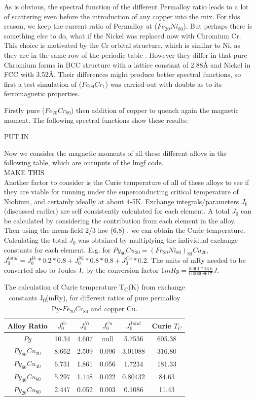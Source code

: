 \documentclass[12pt]{article}
\begin{document}
As is obvious, the spectral function of the different Permalloy ratio leads to a lot of scattering even before the introduction of any copper into the mix. For this reason, we keep the current ratio of Permalloy at ($Fe_{20}Ni_{80}$). But perhaps there is something else to do, what if the Nickel was replaced now with Chromium Cr. This choice is motivated by the Cr orbital structure, which is similar to Ni, as they are in the same row of the periodic table \cite{ashcroft}. However they differ in that pure Chromium forms in BCC structure with a lattice constant of 2.88{\AA} and Nickel in FCC with 3.52{\AA}. Their differences might produce better spectral functions, so first a test simulation of ($Fe_{99}Cr_{1}$) was carried out with doubts as to its ferromagnetic properties.

Firstly pure ($Fe_{20}Cr_{80}$) then addition of copper to quench again the magnetic moment. The following spectral functions show these results:



PUT IN

Now we consider the magnetic moments of all these different alloys in the following table, which are outuputs of the lmgf code.
\\ 
MAKE THIS
\\
\clearpage
Another factor to consider is the Curie temperature of all of these alloys to see if they are viable for running under the superconducting critical temperature of Niobium, and certainly ideally at about 4-5K. Exchange integrals/parameters $J_0$ (discussed earlier) are self consistently calculated for each element. A total $J_0$ can be calculated by considering the contribution from each element in the alloy. Then using the mean-field 2/3 law (6.8) , we can obtain the Curie temperature. Calculating the total $J_0$ was obtained by multiplying the individual exchange constants for each element. E.g. for $Py_{80}Cu_{20}=(Fe_{20}Ni_{80})_{80}Cu_{20}$, $J_0^{total}=J_0^{Fe}*0.2*0.8+J_0^{Ni}*0.8*0.8+J_0^{Cu}*0.2$. The units of mRy needed to be converted also to Joules J, by the conversion factor $1mRy=\frac{0.001*13.6}{0.00008617}J$.
\begin{table}[h!]
\centering
 \begin{tabular}{||c c c c c c||} 
 \hline
 Alloy Ratio & $J_0^{Fe}$ & $J_0^{Ni}$ & $J_0^{Cu}$ & $J_0^{Total}$ & Curie $T_C$ \\ [1ex] 
 \hline\hline
 $Py$ & 10.34 & 4.607 & null & 5.7536 & 605.38 \\ 
 $Py_{80}Cu_{20}$ & 8.662 & 2.509 & 0.096 & 3.01088 & 316.80 \\
 $Py_{60}Cu_{40}$ & 6.731 & 1.861 & 0.056 & 1.7234 & 181.33 \\
 $Py_{40}Cu_{60}$ & 5.297 & 1.148 & 0.022 & 0.80432 & 84.63 \\
 $Py_{20}Cu_{80}$ & 2.447 & 0.052 & 0.003 & 0.1086 & 11.43 \\ [1ex] 
 \hline
 \end{tabular}
\caption{The calculation of Curie temperature T\textsubscript{C}(K) from exchange constants J\textsubscript{0}(mRy), for different ratios of pure permalloy Py-$Fe_{20}Cr_{80}$ and copper Cu.} 
\end{table}
\end{document}
